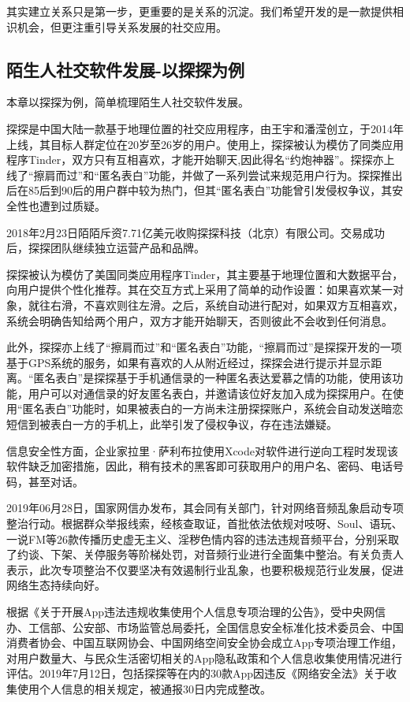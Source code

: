 \documentclass[UTF8]{ctexart}
\begin{document}
其实建立关系只是第一步，更重要的是关系的沉淀。我们希望开发的是一款提供相识机会，但更注重引导关系发展的社交应用。

\subsection{陌生人社交软件发展-以探探为例}
本章以探探为例，简单梳理陌生人社交软件发展。

探探是中国大陆一款基于地理位置的社交应用程序，由王宇和潘滢创立，于2014年上线，其目标人群定位在20岁至26岁的用户。使用上，探探被认为模仿了同类应用程序Tinder，双方只有互相喜欢，才能开始聊天,因此得名“约炮神器”。探探亦上线了“擦肩而过”和“匿名表白”功能，并做了一系列尝试来规范用户行为。探探推出后在85后到90后的用户群中较为热门，但其“匿名表白”功能曾引发侵权争议，其安全性也遭到过质疑。

2018年2月23日陌陌斥资7.71亿美元收购探探科技（北京）有限公司。交易成功后，探探团队继续独立运营产品和品牌。\cite{MoMoHistory}

探探被认为模仿了美国同类应用程序Tinder，其主要基于地理位置和大数据平台，向用户提供个性化推荐。其在交互方式上采用了简单的动作设置：如果喜欢某一对象，就往右滑，不喜欢则往左滑。之后，系统自动进行配对，如果双方互相喜欢，系统会明确告知给两个用户，双方才能开始聊天，否则彼此不会收到任何消息。

此外，探探亦上线了“擦肩而过”和“匿名表白”功能，“擦肩而过”是探探开发的一项基于GPS系统的服务，如果有喜欢的人从附近经过，探探会进行提示并显示距离。“匿名表白”是探探基于手机通信录的一种匿名表达爱慕之情的功能，使用该功能，用户可以对通信录的好友匿名表白，并邀请该位好友加入成为探探用户。在使用“匿名表白”功能时，如果被表白的一方尚未注册探探账户，系统会自动发送暗恋短信到被表白一方的手机上，此举引发了侵权争议，存在违法嫌疑。

信息安全性方面，企业家拉里·萨利布拉使用Xcode对软件进行逆向工程时发现该软件缺乏加密措施，因此，稍有技术的黑客即可获取用户的用户名、密码、电话号码，甚至对话。

2019年06月28日，国家网信办发布，其会同有关部门，针对网络音频乱象启动专项整治行动。根据群众举报线索，经核查取证，首批依法依规对吱呀、Soul、语玩、一说FM等26款传播历史虚无主义、淫秽色情内容的违法违规音频平台，分别采取了约谈、下架、关停服务等阶梯处罚，对音频行业进行全面集中整治。有关负责人表示，此次专项整治不仅要坚决有效遏制行业乱象，也要积极规范行业发展，促进网络生态持续向好。\cite{Audio}

根据《关于开展App违法违规收集使用个人信息专项治理的公告》，受中央网信办、工信部、公安部、市场监管总局委托，全国信息安全标准化技术委员会、中国消费者协会、中国互联网协会、中国网络空间安全协会成立App专项治理工作组，对用户数量大、与民众生活密切相关的App隐私政策和个人信息收集使用情况进行评估。2019年7月12日，包括探探等在内的30款App因违反《网络安全法》关于收集使用个人信息的相关规定，被通报30日内完成整改。\cite{Privacy}
\end{document}

